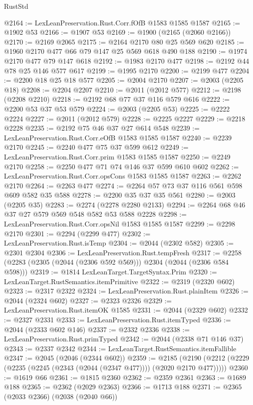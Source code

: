 \begin{lexlean}{RustStd}
\begin{coremodule}
{\begin{coremodule}
{{{{{{{{{{{{{{@2164 := LexLeanPreservation.Rust.Corr.fOfB @1583 @1585 @1587
@2165 := @1902 @53
@2166 := @1907 @53
@2169 := @1900 (@2165 (@2060 @2166))
@2170 := @2169 @2065
@2175 := @2164 @2170 @80 @25 @569 @620
@2185 := @1960 @2170 @477 @66 @79 @147 @25 @569 @618 @490 @188
@2190 := @1974 @2170 @477 @79 @147 @618
@2192 := @1983 @2170 @477
@2198 := @2192 @44 @78 @25 @146 @577 @617
@2199 := @1995 @2170
@2200 := @2199 @477
@2204 := @2200 @18 @25 @18 @577
@2205 := @2004 @2170
@2207 := @2003 (@2205 @18)
@2208 := @2204 @2207
@2210 := @2011 (@2012 @577)
@2212 := @2198 (@2208 @2210)
@2218 := @2192 @68 @77 @37 @116 @579 @616
@2222 := @2200 @53 @37 @53 @579
@2224 := @2003 (@2205 @53)
@2225 := @2222 @2224
@2227 := @2011 (@2012 @579)
@2228 := @2225 @2227
@2229 := @2218 @2228
@2235 := @2192 @75 @46 @37 @27 @614 @548
@2239 := LexLeanPreservation.Rust.Corr.eOfB @1583 @1585 @1587
@2240 := @2239 @2170
@2245 := @2240 @477 @75 @37 @599 @612
@2249 := LexLeanPreservation.Rust.Corr.prim @1583 @1585 @1587
@2250 := @2249 @2170
@2258 := @2250 @477 @71 @74 @146 @37 @599 @610 @602
@2262 := LexLeanPreservation.Rust.Corr.opsCons @1583 @1585 @1587
@2263 := @2262 @2170
@2264 := @2263 @477
@2274 := @2264 @57 @73 @37 @116 @561 @598 @609 @582 @35 @588
@2278 := @2200 @35 @37 @35 @561
@2280 := @2003 (@2205 @35)
@2283 := @2274 (@2278 @2280 @2133)
@2294 := @2264 @68 @46 @37 @27 @579 @569 @548 @582 @53 @588 @2228
@2298 := LexLeanPreservation.Rust.Corr.opsNil @1583 @1585 @1587
@2299 := @2298 @2170
@2301 := @2294 (@2299 @477)
@2302 := LexLeanPreservation.Rust.isTemp
@2304 := @2044 (@2302 @582)
@2305 := @2301 @2304
@2306 := LexLeanPreservation.Rust.tempFresh
@2317 := @2258 (@2283 (@2305 (@2044 (@2306 @592 @569))) @2304 (@2044 (@2306 @584 @598)))
@2319 := @1814 LexLeanTarget.TargetSyntax.Prim
@2320 := LexLeanTarget.RustSemantics.itemPrimitive
@2322 := @2319 (@2320 @602)
@2323 := @2317 @2322
@2324 := LexLeanPreservation.Rust.plainItem
@2326 := @2044 (@2324 @602)
@2327 := @2323 @2326
@2329 := LexLeanPreservation.Rust.itemOK @1585
@2331 := @2044 (@2329 @602)
@2332 := @2327 @2331
@2333 := LexLeanPreservation.Rust.itemTyped
@2336 := @2044 (@2333 @602 @146)
@2337 := @2332 @2336
@2338 := LexLeanPreservation.Rust.primTyped
@2342 := @2044 (@2338 @71 @146 @37)
@2343 := @2337 @2342
@2344 := LexLeanTarget.RustSemantics.itemFallible
@2347 := @2045 (@2046 (@2344 @602))
@2359 := @2185
    (@2190 (@2212 (@2229 (@2235 (@2245 (@2343 (@2044 (@2347 @477)))) (@2020 @2170 @477)))))
@2360 := @1619 @66
@2361 := @1815 @2360
@2362 := @2359 @2361
@2363 := @1689 @188
@2365 := @2362 (@2029 @2363)
@2366 := @1713 @188
@2371 := @2365 (@2033 @2366) (@2038 (@2040 @66))
}}}}}}}}}}}}}}
\end{coremodule}}
\end{coremodule}
\end{lexlean}
